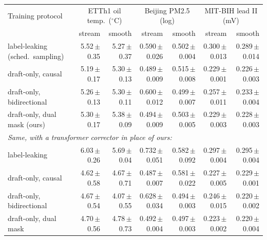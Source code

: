 \begin{tabular}{lrrrrrr}
\toprule
Training protocol & \multicolumn{2}{c}{ETTh1 oil temp.\ ($^\circ$C)} & \multicolumn{2}{c}{Beijing PM2.5 (log)} & \multicolumn{2}{c}{MIT-BIH lead II (mV)} \\
 & stream & smooth & stream & smooth & stream & smooth \\
\midrule
label-leaking (sched.\ sampling) & 5.52\,{\scriptsize$\pm$0.35} & 5.27\,{\scriptsize$\pm$0.37} & 0.590\,{\scriptsize$\pm$0.026} & 0.502\,{\scriptsize$\pm$0.004} & 0.300\,{\scriptsize$\pm$0.013} & 0.289\,{\scriptsize$\pm$0.014} \\
draft-only, causal & 5.19\,{\scriptsize$\pm$0.17} & 5.30\,{\scriptsize$\pm$0.13} & 0.489\,{\scriptsize$\pm$0.009} & 0.515\,{\scriptsize$\pm$0.008} & 0.229\,{\scriptsize$\pm$0.001} & 0.226\,{\scriptsize$\pm$0.003} \\
draft-only, bidirectional & 5.26\,{\scriptsize$\pm$0.13} & 5.30\,{\scriptsize$\pm$0.11} & 0.600\,{\scriptsize$\pm$0.012} & 0.499\,{\scriptsize$\pm$0.007} & 0.257\,{\scriptsize$\pm$0.011} & 0.233\,{\scriptsize$\pm$0.004} \\
draft-only, dual mask (ours) & 5.30\,{\scriptsize$\pm$0.17} & 5.38\,{\scriptsize$\pm$0.09} & 0.494\,{\scriptsize$\pm$0.009} & 0.503\,{\scriptsize$\pm$0.005} & 0.229\,{\scriptsize$\pm$0.003} & 0.228\,{\scriptsize$\pm$0.003} \\
\midrule
\multicolumn{7}{l}{\emph{Same, with a transformer corrector in place of ours:}} \\
\quad label-leaking & 6.03\,{\scriptsize$\pm$0.26} & 5.69\,{\scriptsize$\pm$0.04} & 0.732\,{\scriptsize$\pm$0.051} & 0.582\,{\scriptsize$\pm$0.092} & 0.297\,{\scriptsize$\pm$0.004} & 0.295\,{\scriptsize$\pm$0.004} \\
\quad draft-only, causal & 4.62\,{\scriptsize$\pm$0.58} & 4.67\,{\scriptsize$\pm$0.71} & 0.487\,{\scriptsize$\pm$0.007} & 0.581\,{\scriptsize$\pm$0.022} & 0.227\,{\scriptsize$\pm$0.005} & 0.229\,{\scriptsize$\pm$0.001} \\
\quad draft-only, bidirectional & 4.67\,{\scriptsize$\pm$0.54} & 4.07\,{\scriptsize$\pm$0.55} & 0.628\,{\scriptsize$\pm$0.034} & 0.494\,{\scriptsize$\pm$0.003} & 0.246\,{\scriptsize$\pm$0.015} & 0.220\,{\scriptsize$\pm$0.002} \\
\quad draft-only, dual mask & 4.70\,{\scriptsize$\pm$0.56} & 4.78\,{\scriptsize$\pm$0.73} & 0.492\,{\scriptsize$\pm$0.004} & 0.497\,{\scriptsize$\pm$0.003} & 0.223\,{\scriptsize$\pm$0.002} & 0.220\,{\scriptsize$\pm$0.004} \\
\bottomrule
\end{tabular}
